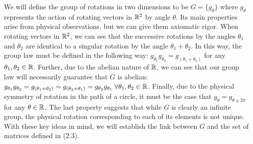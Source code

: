 We will define the group of rotations in two dimensions to be $G = \{g_\theta\}$ where $g_\theta$ represents the action of rotating vectors in $\mathbb{R}^2$ by angle $\theta$. Its main properties arise from physical observations, but we can give them axiomatic rigor. When rotating vectors in $\mathbb{R}^2$, we can see that the successive rotations by the angles $\theta_1$ and $\theta_2$ are identical to a singular rotation by the angle $\theta_1+\theta_2$. In this way, the group law must be defined in the following way: $g_{\theta_1}  g_{\theta_2} = g_{(\theta_1 + \theta_2)}$ for any $\theta_1,\theta_2\in\mathbb{R}$. Further, due to the abelian nature of $\mathbb{R}$, we can see that our group law will necessarily guarantee that $G$ is abelian:  $g_{\theta_1}  g_{\theta_2} = g_{(\theta_1 + \theta_2)}= g_{(\theta_2 + \theta_1)}= g_{\theta_2}  g_{\theta_1} \hspace{1mm}\forall \theta_1,\theta_2\in\mathbb{R}$. Finally, due to the physical symmetry of rotation in the path of a circle, it must be the case that $g_\theta = g_{\theta \pm 2\pi}$ for any $\theta \in \mathbb{R}$. The last property suggests that while $G$ is clearly an infinite group, the physical rotation corresponding to each of its elements is not unique. With these key ideas in mind, we will establish the link between $G$ and the set of matrices defined in (2.3).

